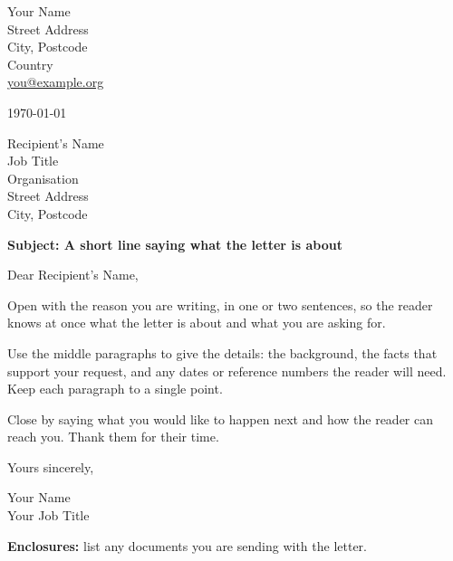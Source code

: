 \documentclass[11pt, a4paper]{article}
\begin{document}
\begin{flushright}
Your Name \\
Street Address \\
City, Postcode \\
Country \\
\href{mailto:you@example.org}{you@example.org}
\end{flushright}

\today

Recipient's Name \\
Job Title \\
Organisation \\
Street Address \\
City, Postcode

\textbf{Subject: A short line saying what the letter is about}

Dear Recipient's Name,

Open with the reason you are writing, in one or two sentences, so the
reader knows at once what the letter is about and what you are asking for.

Use the middle paragraphs to give the details: the background, the facts
that support your request, and any dates or reference numbers the reader
will need. Keep each paragraph to a single point.

Close by saying what you would like to happen next and how the reader can
reach you. Thank them for their time.

Yours sincerely,

\vspace{2.5em}

Your Name \\
Your Job Title

\textbf{Enclosures:} list any documents you are sending with the letter.
\end{document}
